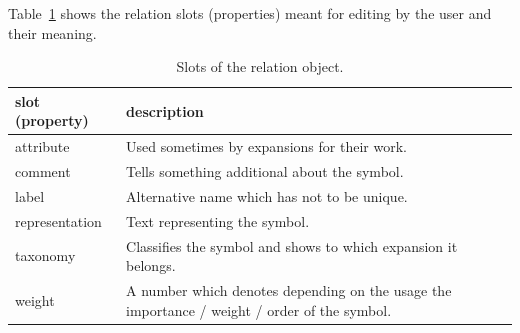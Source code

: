 \documentclass[a4paper, 12pt, openany]{scrbook}
\begin{document}
Table~\ref{tab:relation} shows the relation slots (properties) meant for editing by the user and their meaning.
\begin{table}[htbp]
\centering
\begin{tabular}{|p{4cm}|p{12cm}|}
  \hline
  \textbf{slot (property)} & \textbf{description} \\
  \hline
  attribute & Used sometimes by expansions for their work. \\
  \hline
  comment & Tells something additional about the symbol. \\
  \hline
  label & Alternative name which has not to be unique. \\
  \hline
  representation & Text representing the symbol. \\
  \hline
  taxonomy & Classifies the symbol and shows to which expansion it belongs. \\
  \hline
  weight & A number which denotes depending on the usage the importance / weight / order of the symbol. \\
  \hline
\end{tabular}
\caption{Slots of the relation object.}
\label{tab:relation}
\end{table}
\end{document}
